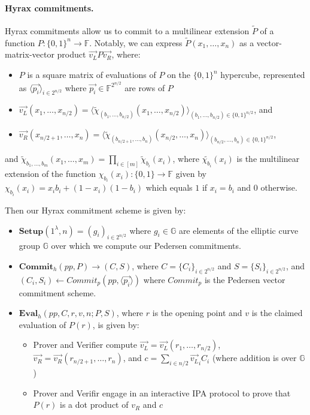 \paragraph{Hyrax commitments.}
Hyrax commitments \cite{SP:WTSTW18} allow us to commit to a multilinear extension $\widetilde{P}$ of a function $P:\{0,1\}^n \rightarrow \mathbb{F}$. 
Notably, we can express $\widetilde{P}(x_1, \dots, x_n)$ as a vector-matrix-vector product $\vec{v_L} P \vec{v_R}$, where:
\begin{itemize}
    \item $P$ is a square matrix of evaluations of $P$ on the $\{0,1\}^{n}$ hypercube, represented as $\langle \vec{p_i}\rangle_{i \in 2^{n/2}}$ where $\vec{p_i} \in \mathbb{F}^{2^{n/2}}$ are rows of $P$
    \item $\vec{v_L}(x_1, \dots, x_{n/2}) = \langle \widetilde{\chi}_{(b_1, \dots, b_{n/2})}(x_1, \dots, x_{n/2})\rangle _{(b_1, \dots, b_{n/2})\in \{0,1\}^{n/2}}$, and 
    \item $\vec{v_R}(x_{n/2+1}, \dots, x_{n}) = \langle \widetilde{\chi}_{(b_{n/2+1}, \dots, b_{n})}(x_{n/2}, \dots, x_{n})\rangle_{(b_{n/2}, \dots, b_{n}) \in \{0,1\}^{n/2}}$,
\end{itemize}
and $\widetilde{\chi}_{b_1, \dots, b_m} (x_1, \dots, x_m) = \prod_{i \in [m]} \widetilde{\chi}_{b_i}(x_i)$, where
$\widetilde{\chi_{b_i}}(x_i)$ is the multilinear extension of the function $\chi_{b_i}(x_i): \{0,1\} \rightarrow \mathbb{F}$ given by $\chi_{b_i}(x_i) = x_ib_i + (1-x_i)(1-b_i)$ which equals $1$ if $x_i = b_i$ and $0$ otherwise.

Then our Hyrax commitment scheme is given by:
\begin{itemize}
    \item $\textbf{Setup}(1^{\lambda}, n) = (g_i)_{i \in 2^{n/2}}$ where $g_i \in \mathbb{G}$ are elements of the elliptic curve group $\mathbb{G}$ over which we compute our Pedersen commitments.
    \item $\textbf{Commit}_h(pp, P) \rightarrow (C,S)$, where 
    $C = \{C_i\}_{i \in 2^{n/2}}$ and $S = \{S_i\}_{i \in 2^{n/2}}$, and
    $(C_i, S_i) \leftarrow Commit_p(pp, \langle \vec{p_i} \rangle)$
    where $Commit_p$ is the Pedersen vector commitment scheme.
    \item $\textbf{Eval}_h(pp, C, r, v, n; P, S)$, where $r$ is the opening point and $v$ is the claimed evaluation of $P(r)$, is given by:
    \begin{itemize}
        \item Prover and Verifier compute $\vec{v_L} = \vec{v_L}(r_1, \dots, r_{n/2})$, $\vec{v_R} = \vec{v_R}(r_{n/2+1}, \dots, r_{n})$, 
    and $c = \sum_{i \in {n/2}} \vec{v_L}_i C_i$ (where addition is over $\mathbb{G}$)
        \item Prover and Verifir engage in an interactive IPA protocol to prove that $P(r)$ is a dot product of $v_R$ and $c$ 
    \end{itemize} 
\end{itemize} 

